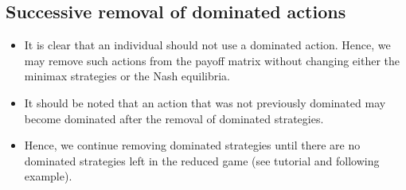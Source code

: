 \documentclass[]{article}
\begin{document}
	\subsection{Successive removal of dominated actions}
	\begin{itemize}
		\item It is clear that an individual should not use a dominated action.
		Hence, we may remove such actions from the payoff matrix without
		changing either the minimax strategies or the Nash equilibria.
		\item	It should be noted that an action that was not previously
		dominated may become dominated after the removal of dominated
		strategies.
		\item Hence, we continue removing dominated strategies until there are
		no dominated strategies left in the reduced game (see tutorial and
		following example).
	\end{itemize}
	
\end{document}
